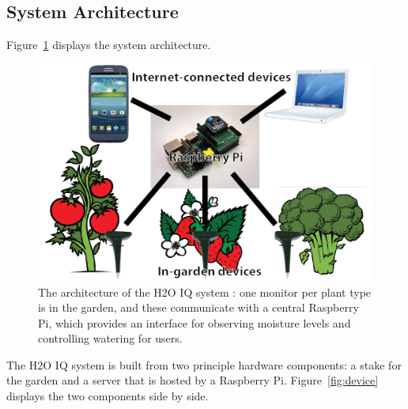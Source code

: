 \documentclass[11pt]{article}
\begin{document}
\subsection{System Architecture}

Figure~\ref{fig:architecture} displays the system architecture.

\begin{figure}[h!]
\begin{center}
\includegraphics[scale=0.7]{./pngs/architecture.png}
\end{center}
\caption{The architecture of the H2O IQ system : one monitor per plant type is in the garden, and these communicate with a central Raspberry Pi, which provides an interface for observing moisture levels and controlling watering for users.}
\label{fig:architecture}
\end{figure}

The H2O IQ system is built from two principle hardware components: a stake for the garden and a server that is hosted by a Raspberry Pi. Figure~\ref{fig:device} displays the two components side by side.
\end{document}
